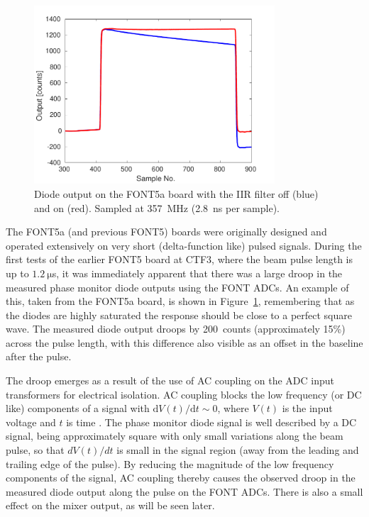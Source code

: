 \begin{figure}
  \centering
  \includegraphics[width=0.8\textwidth]{Figures/commissioning/iirDiodeFiltOffOn}
  \caption{Diode output on the FONT5a board with the IIR filter off (blue) and on (red). Sampled at 357~MHz (2.8~ns per sample).}
  \label{f:iirDiodefiltOffOn}
\end{figure}

The FONT5a (and previous FONT5) boards were originally designed and operated extensively on very short (delta-function like) pulsed signals.
During the first tests of the earlier FONT5 board at CTF3, where the beam pulse length is up to \(1.2~\mathrm{\mu}\)s, it was immediately apparent that there was a large droop in the measured phase monitor diode outputs using the FONT ADCs. An example of this, taken from the FONT5a board, is shown in Figure~\ref{f:iirDiodefiltOffOn}, remembering that as the diodes are highly saturated the response should be close to a perfect square wave. The measured diode output droops by 200~counts (approximately 15\%) across the pulse length, with this difference also visible as an offset in the baseline after the pulse.

The droop emerges as a result of the use of AC coupling on the ADC input transformers for electrical isolation. 
AC coupling blocks the low frequency (or DC like) components of a signal with  \({\mathrm{d}V(t)}/{\mathrm{d}t}\sim0\), where \(V(t)\) is the input voltage and \(t\) is time \cite{acCoupling}. 
The phase monitor diode signal is  well described by a DC signal, being approximately square with only small variations along the beam pulse, so that \({dV(t)}/{dt}\) is small in the signal region (away from the leading and trailing edge of the pulse). By reducing the magnitude of the low frequency components of the signal, AC coupling thereby causes the observed droop in the measured diode output along the pulse on the FONT ADCs.
There is also a small effect on the mixer output, as will be seen later.

